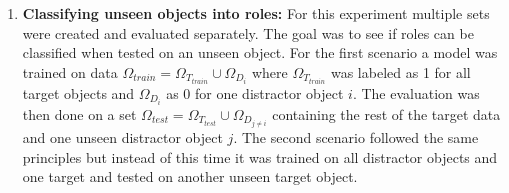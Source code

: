\begin{enumerate}
	\item \textbf{Classifying unseen objects into roles:} For this experiment multiple sets were created and evaluated separately. The goal was to see if roles can be classified when tested on an unseen object. For the first scenario a model was trained on data $ \Omega_{train} = \Omega_{T_{train}} \cup \Omega_{D_{i}} $ where $ \Omega_{T_{train}} $ was labeled as 1 for all target objects and $ \Omega_{D_{i}} $ as 0 for one distractor object $ i $. The evaluation was then done on a set $ \Omega_{test} = \Omega_{T_{test}} \cup \Omega_{D_{j \neq i}} $ containing the rest of the target data and one unseen distractor object $ j $. The second scenario followed the same principles but instead of this time it was trained on all distractor objects and one target and tested on another unseen target object.
\end{enumerate}  

